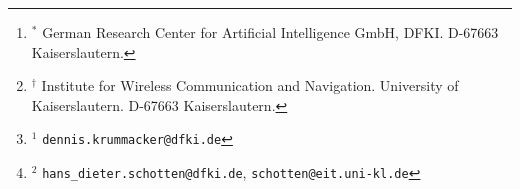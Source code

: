 %
\author{%
Dennis Krummacker$^{1,*}$
and
Hans D. Schotten$^{2,*,\dag}$%
%
\thanks{%
$^{*}$%
German Research Center for Artificial Intelligence GmbH, DFKI.
D-67663 Kaiserslautern.%
}%
%
\thanks{%
$^{\dag}$%
Institute for Wireless Communication and Navigation.
University of Kaiserslautern.
D-67663 Kaiserslautern.%
}%
%
\thanks{%
$^{1}$%
{\tt\small dennis.krummacker@dfki.de}
}%
%
\thanks{%
$^{2}$%
{\tt\small hans\_dieter.schotten@dfki.de}, %
{\tt\small schotten@eit.uni-kl.de}
}%
}%
%